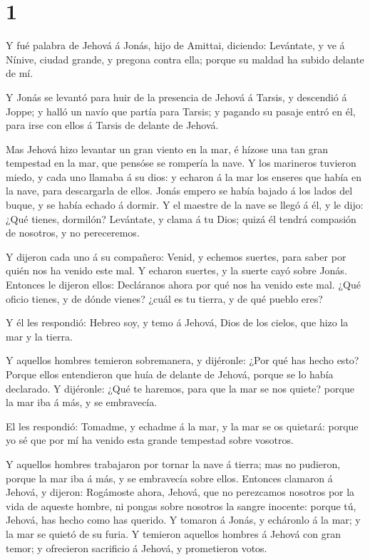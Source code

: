 \hypertarget{section}{%
\section{1}\label{section}}

 Y fué palabra de Jehová á Jonás, hijo de Amittai, diciendo:
 Levántate, y ve á Nínive, ciudad grande, y pregona contra
ella; porque su maldad ha subido delante de mí.

 Y Jonás se levantó para huir de la presencia de Jehová á
Tarsis, y descendió á Joppe; y halló un navío que partía para Tarsis; y
pagando su pasaje entró en él, para irse con ellos á Tarsis de delante
de Jehová.

 Mas Jehová hizo levantar un gran viento en la mar, é hízose
una tan gran tempestad en la mar, que pensóse se rompería la nave.
 Y los marineros tuvieron miedo, y cada uno llamaba á su
dios: y echaron á la mar los enseres que había en la nave, para
descargarla de ellos. Jonás empero se había bajado á los lados del
buque, y se había echado á dormir.  Y el maestre de la nave
se llegó á él, y le dijo: ¿Qué tienes, dormilón? Levántate, y clama á tu
Dios; quizá él tendrá compasión de nosotros, y no pereceremos.

 Y dijeron cada uno á su compañero: Venid, y echemos
suertes, para saber por quién nos ha venido este mal. Y echaron suertes,
y la suerte cayó sobre Jonás.  Entonces le dijeron ellos:
Decláranos ahora por qué nos ha venido este mal. ¿Qué oficio tienes, y
de dónde vienes? ¿cuál es tu tierra, y de qué pueblo eres?

 Y él les respondió: Hebreo soy, y temo á Jehová, Dios de
los cielos, que hizo la mar y la tierra.

 Y aquellos hombres temieron sobremanera, y dijéronle: ¿Por
qué has hecho esto? Porque ellos entendieron que huía de delante de
Jehová, porque se lo había declarado.  Y dijéronle: ¿Qué te
haremos, para que la mar se nos quiete? porque la mar iba á más, y se
embravecía.

 El les respondió: Tomadme, y echadme á la mar, y la mar se
os quietará: porque yo sé que por mí ha venido esta grande tempestad
sobre vosotros.

 Y aquellos hombres trabajaron por tornar la nave á tierra;
mas no pudieron, porque la mar iba á más, y se embravecía sobre ellos.
 Entonces clamaron á Jehová, y dijeron: Rogámoste ahora,
Jehová, que no perezcamos nosotros por la vida de aqueste hombre, ni
pongas sobre nosotros la sangre inocente: porque tú, Jehová, has hecho
como has querido.  Y tomaron á Jonás, y echáronlo á la mar;
y la mar se quietó de su furia.  Y temieron aquellos
hombres á Jehová con gran temor; y ofrecieron sacrificio á Jehová, y
prometieron votos.

